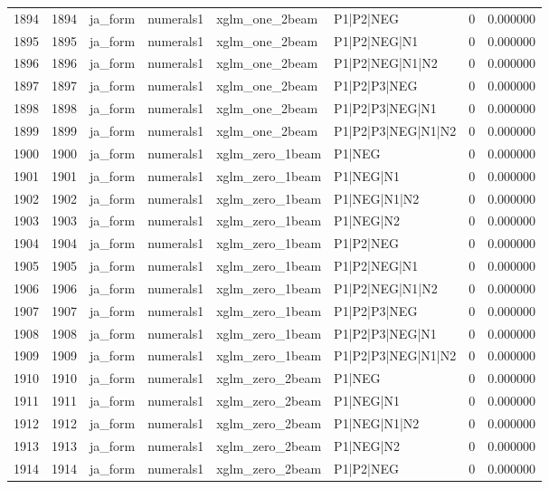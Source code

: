 \begin{tabular}{lrllllrr}
1894 & 1894 & ja_form & numerals1 & xglm_one_2beam & P1|P2|NEG & 0 & 0.000000 \\
1895 & 1895 & ja_form & numerals1 & xglm_one_2beam & P1|P2|NEG|N1 & 0 & 0.000000 \\
1896 & 1896 & ja_form & numerals1 & xglm_one_2beam & P1|P2|NEG|N1|N2 & 0 & 0.000000 \\
1897 & 1897 & ja_form & numerals1 & xglm_one_2beam & P1|P2|P3|NEG & 0 & 0.000000 \\
1898 & 1898 & ja_form & numerals1 & xglm_one_2beam & P1|P2|P3|NEG|N1 & 0 & 0.000000 \\
1899 & 1899 & ja_form & numerals1 & xglm_one_2beam & P1|P2|P3|NEG|N1|N2 & 0 & 0.000000 \\
1900 & 1900 & ja_form & numerals1 & xglm_zero_1beam & P1|NEG & 0 & 0.000000 \\
1901 & 1901 & ja_form & numerals1 & xglm_zero_1beam & P1|NEG|N1 & 0 & 0.000000 \\
1902 & 1902 & ja_form & numerals1 & xglm_zero_1beam & P1|NEG|N1|N2 & 0 & 0.000000 \\
1903 & 1903 & ja_form & numerals1 & xglm_zero_1beam & P1|NEG|N2 & 0 & 0.000000 \\
1904 & 1904 & ja_form & numerals1 & xglm_zero_1beam & P1|P2|NEG & 0 & 0.000000 \\
1905 & 1905 & ja_form & numerals1 & xglm_zero_1beam & P1|P2|NEG|N1 & 0 & 0.000000 \\
1906 & 1906 & ja_form & numerals1 & xglm_zero_1beam & P1|P2|NEG|N1|N2 & 0 & 0.000000 \\
1907 & 1907 & ja_form & numerals1 & xglm_zero_1beam & P1|P2|P3|NEG & 0 & 0.000000 \\
1908 & 1908 & ja_form & numerals1 & xglm_zero_1beam & P1|P2|P3|NEG|N1 & 0 & 0.000000 \\
1909 & 1909 & ja_form & numerals1 & xglm_zero_1beam & P1|P2|P3|NEG|N1|N2 & 0 & 0.000000 \\
1910 & 1910 & ja_form & numerals1 & xglm_zero_2beam & P1|NEG & 0 & 0.000000 \\
1911 & 1911 & ja_form & numerals1 & xglm_zero_2beam & P1|NEG|N1 & 0 & 0.000000 \\
1912 & 1912 & ja_form & numerals1 & xglm_zero_2beam & P1|NEG|N1|N2 & 0 & 0.000000 \\
1913 & 1913 & ja_form & numerals1 & xglm_zero_2beam & P1|NEG|N2 & 0 & 0.000000 \\
1914 & 1914 & ja_form & numerals1 & xglm_zero_2beam & P1|P2|NEG & 0 & 0.000000 \\

\end{tabular}
